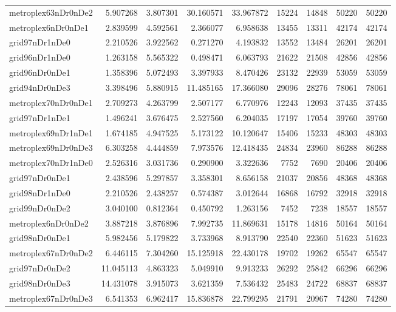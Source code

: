 \begin{longtable}{|l|r|r|r|r|r|r|r|r|}
metroplex63nDr0nDe2 & 5.907268 & 3.807301 & 30.160571 & 33.967872 & 15224 & 14848 & 50220 & 50220 \\
metroplex6nDr0nDe1 & 2.839599 & 4.592561 & 2.366077 & 6.958638 & 13455 & 13311 & 42174 & 42174 \\
grid97nDr1nDe0 & 2.210526 & 3.922562 & 0.271270 & 4.193832 & 13552 & 13484 & 26201 & 26201 \\
grid96nDr1nDe0 & 1.263158 & 5.565322 & 0.498471 & 6.063793 & 21622 & 21508 & 42856 & 42856 \\
grid96nDr0nDe1 & 1.358396 & 5.072493 & 3.397933 & 8.470426 & 23132 & 22939 & 53059 & 53059 \\
grid94nDr0nDe3 & 3.398496 & 5.880915 & 11.485165 & 17.366080 & 29096 & 28276 & 78061 & 78061 \\
metroplex70nDr0nDe1 & 2.709273 & 4.263799 & 2.507177 & 6.770976 & 12243 & 12093 & 37435 & 37435 \\
grid97nDr1nDe1 & 1.496241 & 3.676475 & 2.527560 & 6.204035 & 17197 & 17054 & 39760 & 39760 \\
metroplex69nDr1nDe1 & 1.674185 & 4.947525 & 5.173122 & 10.120647 & 15406 & 15233 & 48303 & 48303 \\
metroplex69nDr0nDe3 & 6.303258 & 4.444859 & 7.973576 & 12.418435 & 24834 & 23960 & 86288 & 86288 \\
metroplex70nDr1nDe0 & 2.526316 & 3.031736 & 0.290900 & 3.322636 & 7752 & 7690 & 20406 & 20406 \\
grid97nDr0nDe1 & 2.438596 & 5.297857 & 3.358301 & 8.656158 & 21037 & 20856 & 48368 & 48368 \\
grid98nDr1nDe0 & 2.210526 & 2.438257 & 0.574387 & 3.012644 & 16868 & 16792 & 32918 & 32918 \\
grid99nDr0nDe2 & 3.040100 & 0.812364 & 0.450792 & 1.263156 & 7452 & 7238 & 18557 & 18557 \\
metroplex6nDr0nDe2 & 3.887218 & 3.876896 & 7.992735 & 11.869631 & 15178 & 14816 & 50164 & 50164 \\
grid98nDr0nDe1 & 5.982456 & 5.179822 & 3.733968 & 8.913790 & 22540 & 22360 & 51623 & 51623 \\
metroplex67nDr0nDe2 & 6.446115 & 7.304260 & 15.125918 & 22.430178 & 19702 & 19262 & 65547 & 65547 \\
grid97nDr0nDe2 & 11.045113 & 4.863323 & 5.049910 & 9.913233 & 26292 & 25842 & 66296 & 66296 \\
grid98nDr0nDe3 & 14.431078 & 3.915073 & 3.621359 & 7.536432 & 25483 & 24722 & 68837 & 68837 \\
metroplex67nDr0nDe3 & 6.541353 & 6.962417 & 15.836878 & 22.799295 & 21791 & 20967 & 74280 & 74280 \\

\end{longtable}
